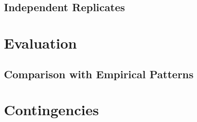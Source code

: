 \documentclass{article}
\begin{document}
\subsection*{Independent Replicates}
\section*{Evaluation}

\subsection*{Comparison with Empirical Patterns}

\section*{Contingencies}
\medskip

\printbibliography
\end{document}
